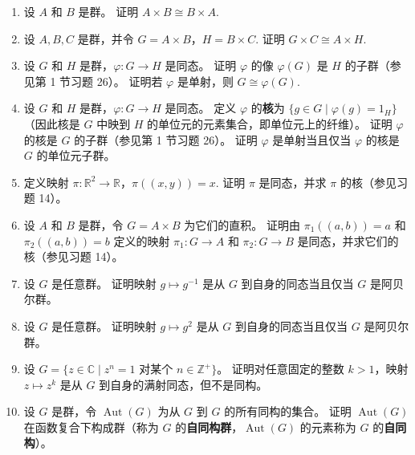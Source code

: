 \begin{enumerate}
\item 设 \( A \) 和 \( B \) 是群。 证明 \( A \times B \cong B \times A \).

\item 设 \( A, B, C \) 是群，并令 \( G = A \times B \)，\( H = B \times C \). 证明 \( G \times C \cong A \times H \).

\item 设 \( G \) 和 \( H \) 是群，\( \varphi : G \to H \) 是同态。 证明 \( \varphi \) 的像 \( \varphi(G) \) 是 \( H \) 的子群（参见第 1 节习题 26）。 证明若 \( \varphi \) 是单射，则 \( G \cong \varphi(G) \).

\item 设 \( G \) 和 \( H \) 是群，\( \varphi : G \to H \) 是同态。 定义 \( \varphi \) 的\textbf{核}为 \( \{ g \in G \mid \varphi(g) = 1_H \} \)（因此核是 \( G \) 中映到 \( H \) 的单位元的元素集合，即单位元上的纤维）。 证明 \( \varphi \) 的核是 \( G \) 的子群（参见第 1 节习题 26）。 证明 \( \varphi \) 是单射当且仅当 \( \varphi \) 的核是 \( G \) 的单位元子群。

\item 定义映射 \( \pi : \mathbb{R}^2 \to \mathbb{R} \)，\( \pi((x, y)) = x \). 证明 \( \pi \) 是同态，并求 \( \pi \) 的核（参见习题 14）。

\item 设 \( A \) 和 \( B \) 是群，令 \( G = A \times B \) 为它们的直积。 证明由 \( \pi_1((a, b)) = a \) 和 \( \pi_2((a, b)) = b \) 定义的映射 \( \pi_1 : G \to A \) 和 \( \pi_2 : G \to B \) 是同态，并求它们的核（参见习题 14）。

\item 设 \( G \) 是任意群。 证明映射 \( g \mapsto g^{-1} \) 是从 \( G \) 到自身的同态当且仅当 \( G \) 是阿贝尔群。

\item 设 \( G \) 是任意群。 证明映射 \( g \mapsto g^2 \) 是从 \( G \) 到自身的同态当且仅当 \( G \) 是阿贝尔群。

\item 设 \( G = \{ z \in \mathbb{C} \mid z^n = 1 \text{ 对某个 } n \in \mathbb{Z}^+ \} \)。 证明对任意固定的整数 \( k > 1 \)，映射 \( z \mapsto z^k \) 是从 \( G \) 到自身的满射同态，但不是同构。

\item 设 \( G \) 是群，令 \( \operatorname{Aut}(G) \) 为从 \( G \) 到 \( G \) 的所有同构的集合。 证明 \( \operatorname{Aut}(G) \) 在函数复合下构成群（称为 \( G \) 的\textbf{自同构群}，\( \operatorname{Aut}(G) \) 的元素称为 \( G \) 的\textbf{自同构}）。


\end{enumerate}
